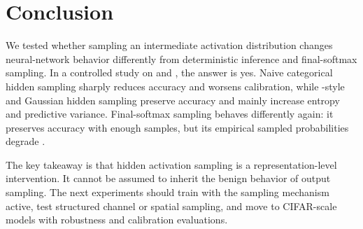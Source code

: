 \section{Conclusion}
\label{sec:conclusion}

We tested whether sampling an intermediate activation distribution changes neural-network behavior differently from deterministic inference and final-softmax sampling. In a controlled \cnn study on \mnist and \fashionmnist, the answer is yes. Naive categorical hidden sampling sharply reduces accuracy and worsens calibration, while \sap-style and Gaussian hidden sampling preserve accuracy and mainly increase entropy and predictive variance. Final-softmax sampling behaves differently again: it preserves accuracy with enough samples, but its empirical sampled probabilities degrade \nll.

The key takeaway is that hidden activation sampling is a representation-level intervention. It cannot be assumed to inherit the benign behavior of output sampling. The next experiments should train with the sampling mechanism active, test structured channel or spatial sampling, and move to CIFAR-scale models with robustness and calibration evaluations.
